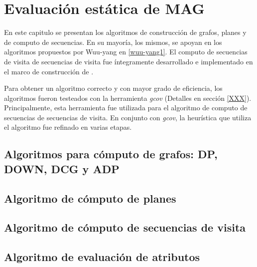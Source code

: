 \chapter{Evaluación estática de MAG}
\label{chap:eval_est}
\minitoc

En este capitulo se presentan los algoritmos de construcción de grafos, planes y de computo de secuencias. En su mayoría, los mismos, se apoyan en los algoritmos propuestos por Wuu-yang en \ref{wuu-yang1}. El computo de secuencias de visita de secuencias de visita fue íntegramente desarrollado e implementado en el marco de construcción de \maggen. 

Para obtener un algoritmo correcto y con mayor grado de eficiencia, los algoritmos fueron testeados con la herramienta \textit{gcov} (Detalles en sección \ref{XXX}). Principalmente, esta herramienta fue utilizada para el algoritmo de computo de secuencias de secuencias de visita. En conjunto con \textit{gcov}, la heurística que utiliza el algoritmo fue refinado en varias etapas.

\section{Algoritmos para cómputo de grafos: DP, DOWN, DCG y ADP}





\section{Algoritmo de cómputo de planes}



\section{Algoritmo de cómputo de secuencias de visita}

\section{Algoritmo de evaluación de atributos}



